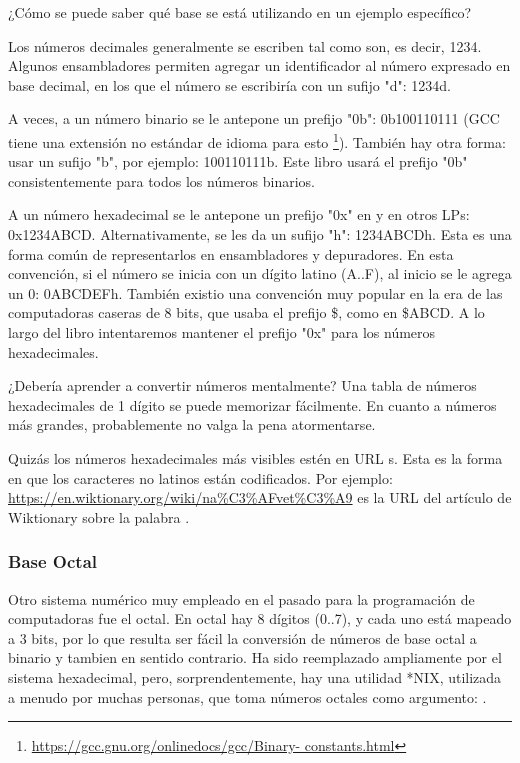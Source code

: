 ¿Cómo se puede saber qué base se está utilizando en un ejemplo específico?

Los números decimales generalmente se escriben tal como son, es decir, 1234. Algunos ensambladores permiten agregar un identificador al número expresado en base decimal, en los que el número se escribiría con un sufijo "d": 1234d.

A veces, a un número binario se le antepone un prefijo "0b": 0b100110111 (\ac{GCC} tiene una extensión no estándar de idioma para esto \footnote {\url {https://gcc.gnu.org/onlinedocs/gcc/Binary- constants.html}}).
También hay otra forma: usar un sufijo "b", por ejemplo: 100110111b.
Este libro usará el prefijo "0b" consistentemente para todos los números binarios.

A un número hexadecimal se le antepone un prefijo "0x" en \CCpp y en otros \ac{LP}s: 0x1234ABCD.
Alternativamente, se les da un sufijo "h": 1234ABCDh. Esta es una forma común de representarlos en ensambladores y depuradores.
En esta convención, si el número se inicia con un dígito latino (A..F), al inicio se le agrega un 0: 0ABCDEFh.
También existio una convención muy  popular en la era de las computadoras caseras de 8 bits, que usaba el prefijo \$, como en \$ABCD.
A lo largo del libro intentaremos mantener el prefijo "0x" para los números hexadecimales.

¿Debería aprender a convertir números mentalmente? Una tabla de números hexadecimales de 1 dígito se puede memorizar fácilmente.
En cuanto a números más grandes, probablemente no valga la pena atormentarse.

Quizás los números hexadecimales más visibles estén en \ac {URL} s.
Esta es la forma en que los caracteres no latinos están codificados.
Por ejemplo:
\url{https://en.wiktionary.org/wiki/na\%C3\%AFvet\%C3\%A9} es la \ac{URL} del artículo de Wiktionary sobre la palabra .

\subsubsection{Base Octal}

Otro sistema numérico muy empleado en el pasado para la programación de computadoras fue el octal. En octal hay 8 dígitos (0..7), y cada uno está mapeado a 3 bits, por lo que resulta ser fácil la conversión de números de base octal a binario y tambien en sentido contrario.
Ha sido reemplazado ampliamente por el sistema hexadecimal, pero, sorprendentemente, hay una utilidad *NIX, utilizada a menudo por muchas personas, que toma números octales como argumento: .

